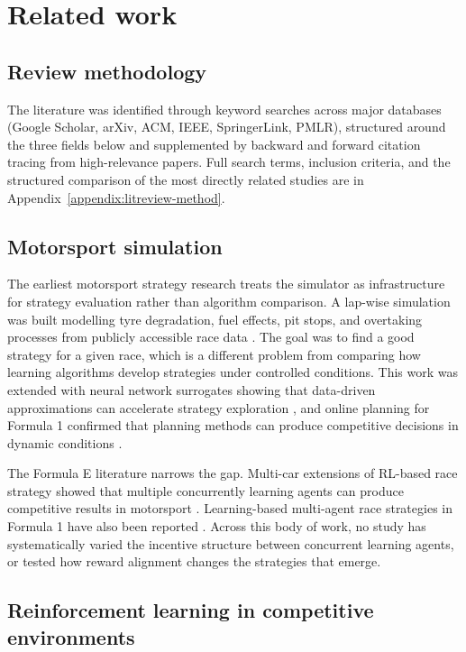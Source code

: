 \section{Related work}
\label{sec:litreview}

\subsection{Review methodology}

The literature was identified through keyword searches across major databases (Google Scholar, arXiv, ACM, IEEE, SpringerLink, PMLR), structured around the three fields below and supplemented by backward and forward citation tracing from high-relevance papers. Full search terms, inclusion criteria, and the structured comparison of the most directly related studies are in Appendix~\ref{appendix:litreview-method}.

\subsection{Motorsport simulation}

The earliest motorsport strategy research treats the simulator as infrastructure for strategy evaluation rather than algorithm comparison. A lap-wise simulation was built modelling tyre degradation, fuel effects, pit stops, and overtaking processes from publicly accessible race data \citep{heilmeier2018racesim}. The goal was to find a good strategy for a given race, which is a different problem from comparing how learning algorithms develop strategies under controlled conditions. This work was extended with neural network surrogates showing that data-driven approximations can accelerate strategy exploration \citep{heilmeier2020virtual}, and online planning for Formula 1 confirmed that planning methods can produce competitive decisions in dynamic conditions \citep{piccinotti2021online}.

The Formula E literature narrows the gap. Multi-car extensions of RL-based race strategy showed that multiple concurrently learning agents can produce competitive results in motorsport \citep{liu2024formulae}. Learning-based multi-agent race strategies in Formula 1 have also been reported \citep{fieni2026learning}. Across this body of work, no study has systematically varied the incentive structure between concurrent learning agents, or tested how reward alignment changes the strategies that emerge.

\subsection{Reinforcement learning in competitive environments}

